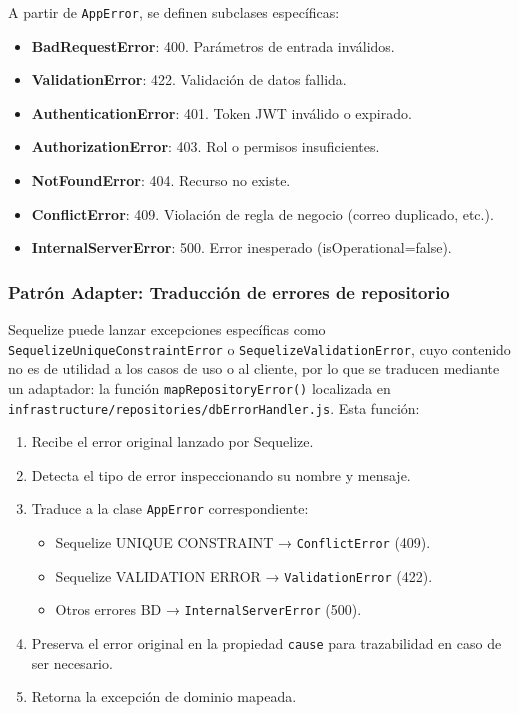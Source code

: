 A partir de \texttt{AppError}, se definen subclases específicas:

\begin{itemize}
  \item \textbf{BadRequestError}: 400. Parámetros de entrada inválidos.
  \item \textbf{ValidationError}: 422. Validación de datos fallida.
  \item \textbf{AuthenticationError}: 401. Token JWT inválido o expirado.
  \item \textbf{AuthorizationError}: 403. Rol o permisos insuficientes.
  \item \textbf{NotFoundError}: 404. Recurso no existe.
  \item \textbf{ConflictError}: 409. Violación de regla de negocio (correo duplicado, etc.).
  \item \textbf{InternalServerError}: 500. Error inesperado (isOperational=false).
\end{itemize}

\subsubsection*{Patrón Adapter: Traducción de errores de repositorio}

Sequelize puede lanzar excepciones específicas como \texttt{SequelizeUniqueConstraintError} o \texttt{SequelizeValidationError}, cuyo contenido no es de utilidad a los casos de uso o al cliente, por lo que se traducen mediante un adaptador: la función \texttt{mapRepositoryError()} localizada en \texttt{infrastructure/repositories/dbErrorHandler.js}. Esta función:

\begin{enumerate}
  \item Recibe el error original lanzado por Sequelize.
  \item Detecta el tipo de error inspeccionando su nombre y mensaje.
  \item Traduce a la clase \texttt{AppError} correspondiente:
    \begin{itemize}
      \item Sequelize UNIQUE CONSTRAINT → \texttt{ConflictError} (409).
      \item Sequelize VALIDATION ERROR → \texttt{ValidationError} (422).
      \item Otros errores BD → \texttt{InternalServerError} (500).
    \end{itemize}
  \item Preserva el error original en la propiedad \texttt{cause} para trazabilidad en caso de ser necesario.
  \item Retorna la excepción de dominio mapeada.
\end{enumerate}

